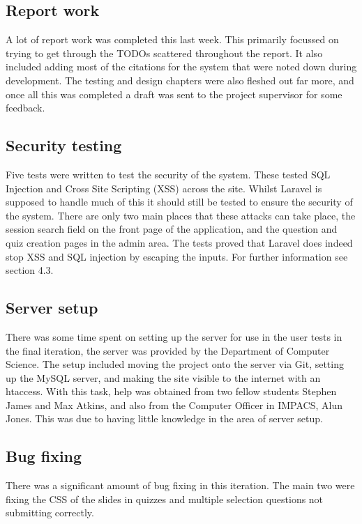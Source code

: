 \subsection{Report work}
A lot of report work was completed this last week. This primarily focussed on trying to get through the TODOs scattered throughout the report. It also included adding most of the citations for the system that were noted down during development. The testing and design chapters were also fleshed out far more, and once all this was completed a draft was sent to the project supervisor for some feedback.

\subsection{Security testing}
Five tests were written to test the security of the system. These tested SQL Injection and Cross Site Scripting (XSS) across the site. Whilst Laravel is supposed to handle much of this it should still be tested to ensure the security of the system. There are only two main places that these attacks can take place, the session search field on the front page of the application, and the question and quiz creation pages in the admin area. The tests proved that Laravel does indeed stop XSS and SQL injection by escaping the inputs. For further information see section 4.3.

\subsection{Server setup}
There was some time spent on setting up the server for use in the user tests in the final iteration, the server was provided by the Department of Computer Science. The setup included moving the project onto the server via Git, setting up the MySQL server, and making the site visible to the internet with an htaccess. With this task, help was obtained from two fellow students Stephen James and Max Atkins, and also from the Computer Officer in IMPACS, Alun Jones. This was due to having little knowledge in the area of server setup.
\newpage

\subsection{Bug fixing}
There was a significant amount of bug fixing in this iteration. The main two were fixing the CSS of the slides in quizzes and multiple selection questions not submitting correctly. 

